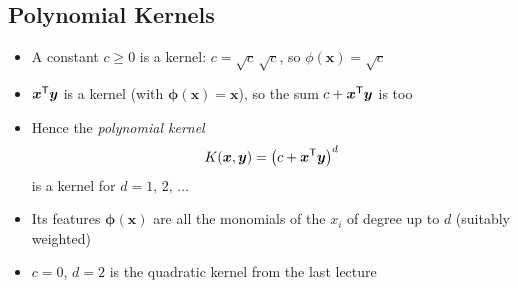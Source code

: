 \begin{slide}
\section[-2]{Polynomial Kernels}

\begin{PauseHighLight}
  \begin{itemize}
  \item A constant $c\geq0$ is a kernel: $c = \sqrt{c}\,\sqrt{c}$, so
    $\phi(\bm{x})=\sqrt{c}$\pause
  \item $\bm{x}^{\textsf{T}}\bm{y}$ is a kernel (with $\bm{\phi}(\bm{x})=\bm{x}$),
    so the sum $c+\bm{x}^{\textsf{T}}\bm{y}$ is too\pause
  \item Hence the \emph{polynomial kernel}
    \begin{align*}
      K(\bm{x},\bm{y}) = \left(c+\bm{x}^{\textsf{T}}\bm{y}\right)^d
    \end{align*}
    is a kernel for $d=1,\,2,\,\ldots$\pause
  \item Its features $\bm{\phi}(\bm{x})$ are all the monomials of the
    $x_i$ of degree up to $d$ (suitably weighted)\pause
  \item $c=0$, $d=2$ is the quadratic kernel from the last
    lecture\pause
  \end{itemize}
\end{PauseHighLight}

\end{slide}

